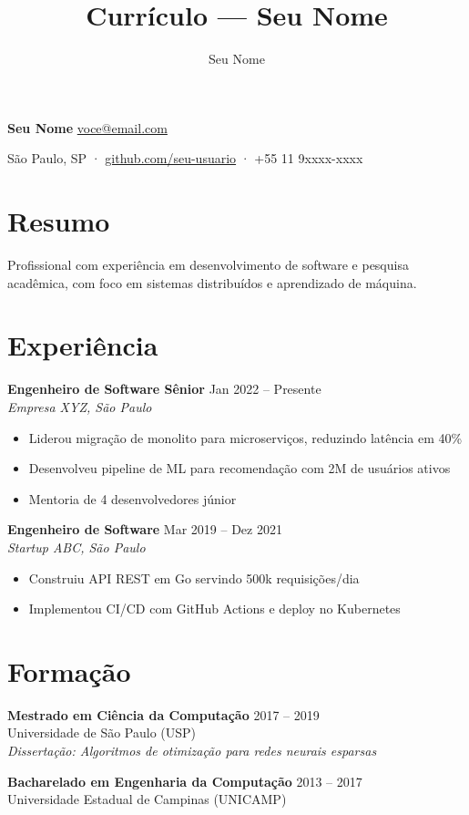 \documentclass[11pt,a4paper]{article}
\title{Currículo — Seu Nome}
\author{Seu Nome}
\date{}
\begin{document}
{\LARGE\bfseries Seu Nome} \hfill \href{mailto:voce@email.com}{voce@email.com}

\medskip
São Paulo, SP · \href{https://github.com/seu-usuario}{github.com/seu-usuario} · +55 11 9xxxx-xxxx

\section{Resumo}
Profissional com experiência em desenvolvimento de software e pesquisa acadêmica,
com foco em sistemas distribuídos e aprendizado de máquina.

\section{Experiência}

\textbf{Engenheiro de Software Sênior} \hfill Jan 2022 -- Presente \\
\textit{Empresa XYZ, São Paulo}
\begin{itemize}
  \item Liderou migração de monolito para microserviços, reduzindo latência em 40\%
  \item Desenvolveu pipeline de ML para recomendação com 2M de usuários ativos
  \item Mentoria de 4 desenvolvedores júnior
\end{itemize}

\medskip
\textbf{Engenheiro de Software} \hfill Mar 2019 -- Dez 2021 \\
\textit{Startup ABC, São Paulo}
\begin{itemize}
  \item Construiu API REST em Go servindo 500k requisições/dia
  \item Implementou CI/CD com GitHub Actions e deploy no Kubernetes
\end{itemize}

\section{Formação}

\textbf{Mestrado em Ciência da Computação} \hfill 2017 -- 2019 \\
Universidade de São Paulo (USP) \\
\textit{Dissertação: Algoritmos de otimização para redes neurais esparsas}

\medskip
\textbf{Bacharelado em Engenharia da Computação} \hfill 2013 -- 2017 \\
Universidade Estadual de Campinas (UNICAMP)
\end{document}
